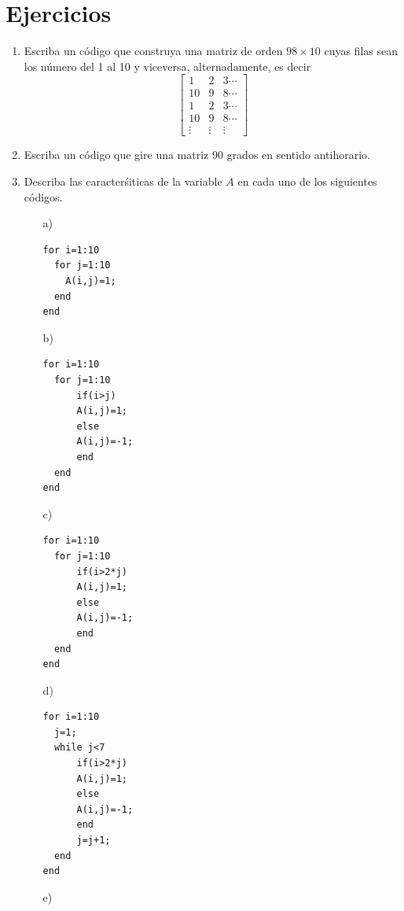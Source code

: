\documentclass[11pt]{article}
\begin{document}
\section{Ejercicios}
  \begin{enumerate}
   \item Escriba un c\'odigo que construya una matriz de orden $98\times 10$ cuyas filas sean los n\'umero del 1 al 10 y viceversa, alternadamente, es 
   decir
	$$
	\left [
	     \begin{array}{ccc}
	      1 & 2 & 3 \cdots  \\
	      10 & 9 & 8 \cdots \\
     	      1 & 2 & 3 \cdots  \\
	      10 & 9 & 8 \cdots \\
	      \vdots & \vdots & \vdots
	     \end{array}
	\right]
	$$
  \item Escriba un c\'odigo que gire una matriz 90 grados en sentido antihorario.
  
  \item Describa las caracter\'siticas de la variable $A$ en cada uno de los siguientes c\'odigos.
	\begin{multicols}{2}
    \begin{itemize}
     \item[a)] 
\begin{verbatim}
for i=1:10
  for j=1:10
    A(i,j)=1;
  end
end
\end{verbatim}
      \item[b)] 
\begin{verbatim}
for i=1:10
  for j=1:10
      if(i>j)
      A(i,j)=1;
      else
      A(i,j)=-1;
      end
  end
end
\end{verbatim}
      \item[c)] 
\begin{verbatim}
for i=1:10
  for j=1:10
      if(i>2*j)
      A(i,j)=1;
      else
      A(i,j)=-1;
      end
  end
end
\end{verbatim}

   \item[d)] 
\begin{verbatim}
for i=1:10
  j=1;
  while j<7
      if(i>2*j)
      A(i,j)=1;
      else
      A(i,j)=-1;
      end
      j=j+1;
  end
end
\end{verbatim}

   \item[e)] 
\begin{verbatim}


\end{verbatim}
\end{itemize}
\end{multicols}
\end{enumerate}
\end{document}
